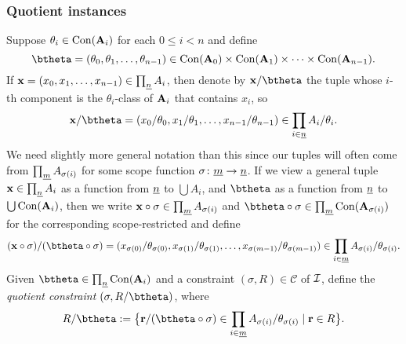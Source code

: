 \subsubsection{Quotient instances}
Suppose $\theta_i \in \operatorname{Con} (\mathbf{A}_i)$ for each $0\leq i < n$ and define
\[
\btheta = (\theta_0, \theta_1, \dots, \theta_{n-1}) \in
\Con (\bA_0) \times \Con (\bA_1) \times \cdots \times \Con (\bA_{n-1}).
\]
If $\mathbf{x} = (x_0, x_1, \dots, x_{n-1}) \in \prod_{\underline{n}} A_i$, then denote
by $\bx/\btheta$ the tuple whose $i$-th component is the $\theta_i$-class of $\mathbf{A}_i$
that contains $x_i$, so 
\[
\bx/\btheta = (x_0/\theta_0, x_1/\theta_1, \dots, x_{n-1}/\theta_{n-1}) \in
\prod_{i \in \nn} A_i/\theta_i.
\]
We need slightly more general notation than this since our tuples will often 
come from
$\prod_{\underline{m}} A_{\sigma(i)}$ for some scope function
$\sigma\colon \underline{m} \to \underline{n}$.  If we view a general tuple $\mathbf{x} \in \prod_{\underline{n}} A_i$
as a function from $\underline{n}$ to $\bigcup A_i$, and $\btheta$ as a function from
$\underline{n}$ to $\bigcup \operatorname{Con} (\mathbf{A}_i)$, then we write
$\mathbf{x} \circ \sigma \in \prod_{\underline{m}} A_{\sigma(i)}$ and
$\btheta \circ \sigma \in \prod_{\mm} \Con (\bA_{\sigma(i)})$ for the corresponding
scope-restricted
and define
\[
(\bx \circ \sigma)/(\btheta \circ \sigma) =
(x_{\sigma(0)}/\theta_{\sigma(0)}, x_{\sigma(1)}/\theta_{\sigma(1)}, \dots, x_{\sigma(m-1)}/\theta_{\sigma(m-1)})
\in  \prod_{i\in \mm} A_{\sigma(i)}/\theta_{\sigma(i)}.
\]
Given
$\btheta \in \prod_{\nn}\Con (\bA_i)$ and
a constraint $(\sigma, R) \in \mathcal C$ of $\mathcal{I}$, define the
\emph{quotient constraint} $(\sigma, R/\btheta)$, where
\begin{equation}
  \label{eq:5}
  R/\btheta := \bigl\{\br/(\btheta\circ \sigma)
  \in \prod_{i \in \mm} A_{\sigma(i)}/\theta_{\sigma(i)} \mid \br \in R\bigr\}.
\end{equation}
